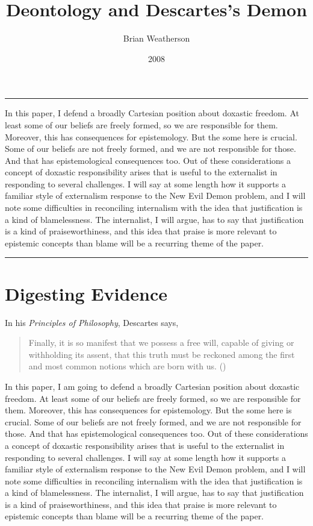 \documentclass[
  10pt,
  letterpaper,
  DIV=11,
  numbers=noendperiod,
  twoside]{scrartcl}
\title{Deontology and Descartes's Demon}
\author{Brian Weatherson}
\date{2008}
\renewenvironment{abstract}
 {\vspace{-1.25cm}
 \quotation\small\noindent\rule{\linewidth}{.5pt}\par\smallskip
 \noindent }
 {\par\noindent\rule{\linewidth}{.5pt}\endquotation}
\begin{document}
\maketitle
\begin{abstract}
In this paper, I defend a broadly Cartesian position about doxastic
freedom. At least some of our beliefs are freely formed, so we are
responsible for them. Moreover, this has consequences for epistemology.
But the some here is crucial. Some of our beliefs are not freely formed,
and we are not responsible for those. And that has epistemological
consequences too. Out of these considerations a concept of doxastic
responsibility arises that is useful to the externalist in responding to
several challenges. I will say at some length how it supports a familiar
style of externalism response to the New Evil Demon problem, and I will
note some difficulties in reconciling internalism with the idea that
justification is a kind of blamelessness. The internalist, I will argue,
has to say that justification is a kind of praiseworthiness, and this
idea that praise is more relevant to epistemic concepts than blame will
be a recurring theme of the paper.
\end{abstract}

\section{Digesting Evidence}\label{digesting-evidence}

In his \emph{Principles of Philosophy}, Descartes says,

\begin{quote}
Finally, it is so manifest that we possess a free will, capable of
giving or withholding its assent, that this truth must be reckoned among
the first and most common notions which are born with us.
()
\end{quote}

In this paper, I am going to defend a broadly Cartesian position about
doxastic freedom. At least some of our beliefs are freely formed, so we
are responsible for them. Moreover, this has consequences for
epistemology. But the some here is crucial. Some of our beliefs are not
freely formed, and we are not responsible for those. And that has
epistemological consequences too. Out of these considerations a concept
of doxastic responsibility arises that is useful to the externalist in
responding to several challenges. I will say at some length how it
supports a familiar style of externalism response to the New Evil Demon
problem, and I will note some difficulties in reconciling internalism
with the idea that justification is a kind of blamelessness. The
internalist, I will argue, has to say that justification is a kind of
praiseworthiness, and this idea that praise is more relevant to
epistemic concepts than blame will be a recurring theme of the paper.
\end{document}
